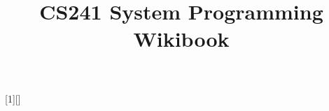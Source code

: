 \usepackage{epigraph}

\usepackage[Bjornstrup]{fncychap}
\singlespacing
{}
\title{\vspace{-15mm}\fontsize{24pt}{10pt}\selectfont\textbf{CS241 System Programming Wikibook}}
\date{}

\newcommand{\keyword}[1]{\texttt{#1}}
\newcommand{\todo}[1]{}
\renewcommand{\todo}[1]{{\color{red} TODO: {#1}}}
[1][]%
  {\noindent\minipage{\linewidth}\medskip 
   \lstset{basicstyle=\ttfamily\footnotesize,frame=single,#1}}
  {\endminipage}

\newenvironment{proof}{\begin{shaded*}\paragraph{Proof:}}{\hfill$\square$\end{shaded*}}
\newenvironment{aside}{\begin{shaded*}\textbf{Aside}\\}{\end{shaded*}}
\newenvironment{tableau}{\begin{shaded*}\begin{longtable}}{\end{longtable}\end{shaded*}}
\usepackage{wrapfig}

\usepackage{multicol}
\usepackage{tabularx}

\usepackage{csquotes}
